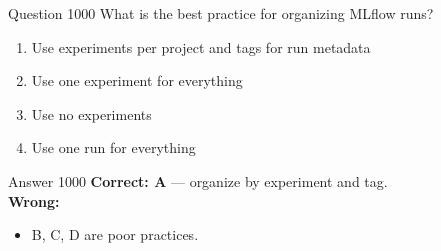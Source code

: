 \documentclass[aspectratio=169,11pt]{beamer}
\begin{document}
	\begin{frame}{Question 1000}
		What is the best practice for organizing MLflow runs?
		\begin{enumerate}[label=\Alph*.]
			\item Use experiments per project and tags for run metadata
			\item Use one experiment for everything
			\item Use no experiments
			\item Use one run for everything
		\end{enumerate}
	\end{frame}
	\begin{frame}{Answer 1000}
		\textbf{Correct: A} --- organize by experiment and tag.\\
		\vspace{0.5em}
		\textbf{Wrong:}
		\begin{itemize}
			\item B, C, D are poor practices.
		\end{itemize}
	\end{frame}
	
\end{document}

